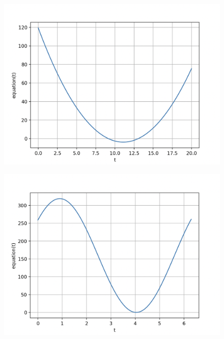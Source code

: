 \documentclass[titlepage]{article}
\begin{document}
\begin{figure}[H]
\begin{minipage}[t]{.4\textwidth}
    \label{fig:Speedup 2sphere scene}
  \end{minipage}
\end{figure}

\begin{figure}[H]
  \centering
  \begin{minipage}[t]{.4\textwidth}
    \centering
    \includegraphics[width=1\linewidth]{Images/speedup_euclidean_graph.png}
    \label{fig:Speedup euclidean graph}
  \end{minipage}%
  \hspace{0.04\textwidth} %
  \begin{minipage}[t]{.4\textwidth}
    \centering
    \includegraphics[width=1\linewidth]{Images/speedup_2sphere_graph.png}
    \label{fig:Speedup 2sphere graph}
  \end{minipage}
\end{figure}
\end{document}
